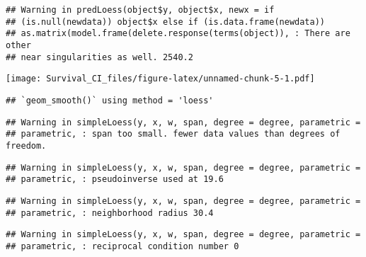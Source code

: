 \documentclass[]{article}
\newenvironment{Shaded}{\begin{snugshade}}{\end{snugshade}}
\newcommand{\KeywordTok}[1]{\textcolor[rgb]{0.13,0.29,0.53}{\textbf{{#1}}}}
\newcommand{\DataTypeTok}[1]{\textcolor[rgb]{0.13,0.29,0.53}{{#1}}}
\newcommand{\StringTok}[1]{\textcolor[rgb]{0.31,0.60,0.02}{{#1}}}
\newcommand{\NormalTok}[1]{{#1}}
\begin{document}
\begin{verbatim}
## Warning in predLoess(object$y, object$x, newx = if
## (is.null(newdata)) object$x else if (is.data.frame(newdata))
## as.matrix(model.frame(delete.response(terms(object)), : There are other
## near singularities as well. 2540.2
\end{verbatim}

\texttt{[image: Survival\_CI\_files/figure-latex/unnamed-chunk-5-1.pdf]}

\begin{Shaded}
\end{Shaded}

\begin{verbatim}
## `geom_smooth()` using method = 'loess'
\end{verbatim}

\begin{verbatim}
## Warning in simpleLoess(y, x, w, span, degree = degree, parametric =
## parametric, : span too small. fewer data values than degrees of freedom.
\end{verbatim}

\begin{verbatim}
## Warning in simpleLoess(y, x, w, span, degree = degree, parametric =
## parametric, : pseudoinverse used at 19.6
\end{verbatim}

\begin{verbatim}
## Warning in simpleLoess(y, x, w, span, degree = degree, parametric =
## parametric, : neighborhood radius 30.4
\end{verbatim}

\begin{verbatim}
## Warning in simpleLoess(y, x, w, span, degree = degree, parametric =
## parametric, : reciprocal condition number 0
\end{verbatim}
\end{document}

